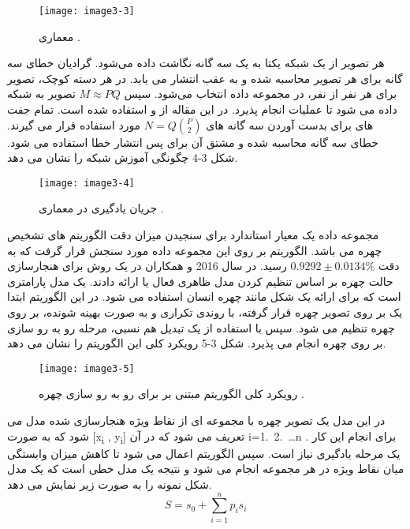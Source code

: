  \begin{figure}[h]
\centering
  \texttt{[image: image3-3]}
  \caption{معماری   \cite{ref1}.}
  \label{image2-1}
\end{figure}
\noindent
هر تصویر از یک شبکه یکتا به یک سه گانه نگاشت داده می‌شود. گرادیان خطای سه گانه برای هر تصویر محاسبه شده و به عقب انتشار می یابد. در هر دسته کوچک،  تصویر برای هر نفر از  نفر، در مجموعه داده انتخاب می‌شود. سپس
$M \approx PQ$
تصویر به شبکه داده می شود تا عملیات  انجام پذیرد. در این مقاله از
و
استفاده شده است. تمام جفت های  برای بدست آوردن سه گانه های
$N = Q \binom{P}{2}$
مورد استفاده قرار می گیرند. خطای سه گانه محاسبه شده و مشتق آن برای پس انتشار خطا استفاده می شود. شکل 3-4 چگونگی آموزش شبکه را نشان می دهد.
 \begin{figure}[h]
\centering
  \texttt{[image: image3-4]}
  \caption{جریان یادگیری در معماری  \cite{ref1}.}
  \label{image2-1}
\end{figure}
\noindent
مجموعه داده  یک معیار استاندارد برای سنجیدن میزان دقت الگوریتم های تشخیص چهره می باشد. الگوریتم  بر روی این مجموعه داده مورد سنجش قرار گرفت که به دقت
 $0.9292\pm0.0134 \%$ 
رسید.
\noindent
در سال 2016  و همکاران در \cite{HAGHIGHAT201623} یک روش برای هنجارسازی حالت چهره بر اساس تنظیم کردن مدل  ظاهری فعال  یا  ارائه دادند.  یک مدل پارامتری است که برای ارائه یک شکل مانند چهره انسان استفاده می شود. در این الگوریتم ابتدا یک  بر روی تصویر چهره قرار گرفته، با روندی تکراری و به صورت بهینه شونده، بر روی چهره تنظیم می شود. سپس با استفاده از یک تبدیل هم نسبی، مرحله رو به رو سازی بر روی چهره انجام می پذیرد. شکل 3-5 رویکرد کلی این الگوریتم را نشان می دهد. 
 \begin{figure}[h]
\centering
  \texttt{[image: image3-5]}
  \caption{رویکرد کلی الگوریتم مبتنی بر  برای رو به رو سازی چهره \cite{ref1}.}
  \label{image2-1}
\end{figure}
\noindent
در این مدل یک تصویر چهره با مجموعه ای از نقاط ویژه هنجارسازی شده مدل می شود که به صورت
[x\textsubscript{i} , y\textsubscript{i}]
تعریف می شود که در آن
i=1.\ 2.\ \ldots n .
برای انجام این کار یک مرحله یادگیری نیاز است. سپس الگوریتم  اعمال می شود تا کاهش میزان وابستگی میان نقاط ویژه در هر مجموعه انجام می شود و نتیجه یک مدل خطی است که یک مدل شکل نمونه را به صورت زیر نمایش می دهد.
\begin{equation}\label{eq3-1}
S=s_0+\sum_{i=1}^{n}{p_is_i}
\end{equation}
	
